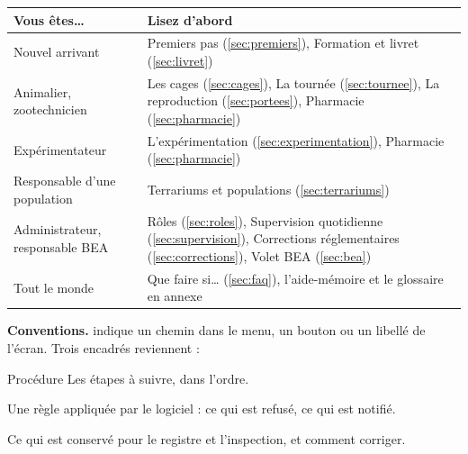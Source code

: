 \documentclass[11pt,a4paper]{article}
\begin{document}
\begin{center}
\begin{tabularx}{\textwidth}{@{}lX@{}}
\toprule
\textbf{Vous êtes…} & \textbf{Lisez d'abord}\\
\midrule
Nouvel arrivant & Premiers pas (\ref{sec:premiers}), Formation et livret (\ref{sec:livret})\\
Animalier, zootechnicien & Les cages (\ref{sec:cages}), La tournée (\ref{sec:tournee}), La reproduction (\ref{sec:portees}), Pharmacie (\ref{sec:pharmacie})\\
Expérimentateur & L'expérimentation (\ref{sec:experimentation}), Pharmacie (\ref{sec:pharmacie})\\
Responsable d'une population & Terrariums et populations (\ref{sec:terrariums})\\
Administrateur, responsable BEA & Rôles (\ref{sec:roles}), Supervision quotidienne (\ref{sec:supervision}), Corrections réglementaires (\ref{sec:corrections}), Volet BEA (\ref{sec:bea})\\
Tout le monde & Que faire si… (\ref{sec:faq}), l'aide-mémoire et le glossaire en annexe\\
\bottomrule
\end{tabularx}
\end{center}

\noindent\textbf{Conventions.}  indique un
chemin dans le menu,  un bouton ou un libellé de l'écran.
Trois encadrés reviennent :
\begin{procedure}{Procédure}
Les étapes à suivre, dans l'ordre.
\end{procedure}
\begin{regle}
Une règle appliquée par le logiciel : ce qui est refusé, ce qui est notifié.
\end{regle}
\begin{trace}
Ce qui est conservé pour le registre et l'inspection, et comment corriger.
\end{trace}
\end{document}
